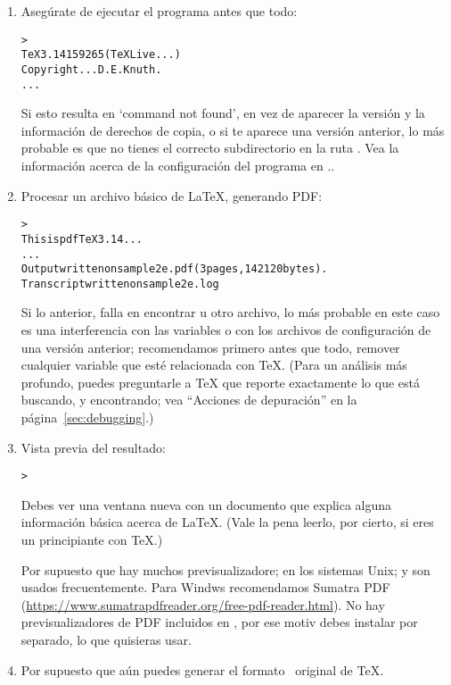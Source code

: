 \documentclass{article}
\begin{document}
\begin{enumerate}
	\item Asegúrate de ejecutar el programa  antes
		que todo:
	\begin{alltt}
		> 
		TeX 3.14159265 (TeX Live ...)
		Copyright ... D.E. Knuth.
		...
	\end{alltt}
Si esto resulta en `command not found', en vez de aparecer la versión y la
información de derechos de copia, o si te aparece una versión
anterior, lo más probable es que no tienes el correcto subdirectorio
 en la ruta . Vea la información acerca de
la configuración del programa en \p.\pageref{sec:env}. 

\item Procesar un archivo básico de \LaTeX{}, generando PDF:
\begin{alltt}
	> 
	This is pdfTeX 3.14 ...
	...
	Output written on sample2e.pdf (3 pages, 142120 bytes).
	Transcript written on sample2e.log
\end{alltt}

Si lo anterior, falla en encontrar  u otro
archivo, lo más probable en este caso es una interferencia con
las variables o con los archivos de configuración de una
versión anterior; recomendamos primero antes que todo, remover
cualquier variable que esté relacionada con \TeX.  (Para un
análisis más profundo, puedes preguntarle a \TeX{} que reporte
exactamente lo que está buscando, y encontrando; vea
``Acciones de depuración'' en la página~\ref{sec:debugging}.)

\item Vista previa del resultado:
\begin{alltt}
>     
\end{alltt}
Debes ver una ventana nueva con un documento que explica alguna
información básica acerca de \LaTeX{}. (Vale la pena leerlo, por
cierto, si eres un principiante con \TeX.)

Por supuesto que hay muchos previsualizadore; en los sistemas Unix;  y  son usados frecuentemente. Para Windws recomendamos Sumatra PDF (\url{https://www.sumatrapdfreader.org/free-pdf-reader.html}). No hay previsualizadores de PDF incluidos en
\TL{}, por ese motiv debes instalar por separado, lo que quisieras usar.

\item Por supuesto que aún puedes generar el formato \dvi\ original de
\TeX{}.


\end{enumerate}
\end{document}
